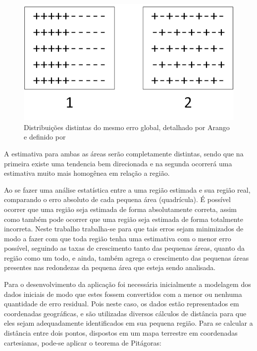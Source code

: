\begin{figure}[h]
	\centering	
	\includegraphics[scale=2]{Figuras/Ilustration-ErrorDistArango.png}
	\caption{Distribuições distintas do mesmo erro global, detalhado por Arango e definido por \cite{willis1995spatial}}
	\label{fig:ErrorDistArango}
\end{figure}

A estimativa para ambas as áreas serão completamente distintas, sendo que na primeira existe uma tendencia bem direcionada e na segunda ocorrerá uma estimativa muito mais homogênea em relação a região. 

Ao se fazer uma análise estatística entre a uma região estimada e sua região real, comparando o erro absoluto de cada pequena área (quadrícula). É possível ocorrer que uma região seja estimada de forma absolutamente correta, assim como também pode ocorrer que uma região seja estimada de forma totalmente incorreta. Neste trabalho trabalha-se para que tais erros sejam minimizados de modo a fazer com que toda região tenha uma estimativa com o menor erro possível, seguindo as taxas de crescimento tanto das pequenas áreas, quanto da região como um todo, e ainda, também agrega o crescimento das pequenas áreas presentes nas redondezas da pequena área que esteja sendo analisada.

Para o desenvolvimento da aplicação foi necessária inicialmente a modelagem dos dados iniciais de modo que estes fossem convertidos com a menor ou nenhuma quantidade de erro residual. Pois neste caso, os dados estão representados em coordenadas geográficas, e são utilizadas diversos cálculos de distância para que eles sejam adequadamente identificados em sua pequena região. Para se calcular a distância entre dois pontos, dispostos em um mapa terrestre em coordenadas cartesianas, pode-se aplicar o teorema de Pitágoras:

